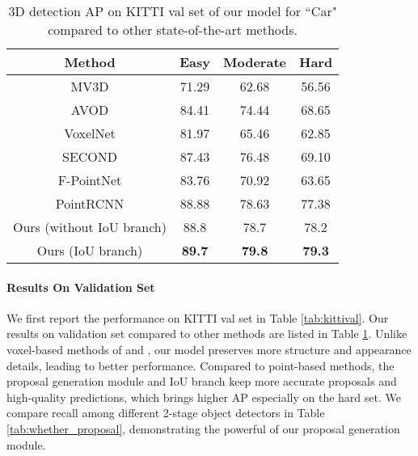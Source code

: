 \documentclass[10pt,twocolumn,letterpaper]{article}
\begin{document}
\begin{table}[t]
   \centering \addtolength{\tabcolsep}{-1pt}
   \footnotesize
   \begin{tabular}{|c|ccc|}
      \hline
      Method & Easy & Moderate & Hard \\
      \hline
      MV3D \cite{MV3D} & 71.29 & 62.68 & 56.56 \\
      AVOD \cite{AVOD} & 84.41 & 74.44 & 68.65 \\
      VoxelNet \cite{VOXELNET} & 81.97 & 65.46 & 62.85 \\ 
      SECOND \cite{yan2018second} & 87.43 & 76.48 & 69.10 \\
      F-PointNet \cite{FPOINTNET} & 83.76 & 70.92 & 63.65 \\
      PointRCNN \cite{shi2018pointrcnn} & 88.88 & 78.63 & 77.38 \\
      \hline
      Ours (without IoU branch) & 88.8 & 78.7 & 78.2 \\
      Ours (IoU branch) & \bf 89.7 & \bf 79.8 & \bf 79.3 \\
      \hline
   \end{tabular}\vspace{0.1cm}
   \caption{3D detection AP on KITTI val set of our model for ``Car" compared to other state-of-the-art methods.}\vspace{-0.05in}
   \label{tab:kittival_compare}
\end{table}



\vspace{-0.1in}
\paragraph{Results On Validation Set}
We first report the performance on KITTI val set in Table \ref{tab:kittival}. Our results on validation set compared to other methods are listed in Table \ref{tab:kittival_compare}. Unlike voxel-based methods of \cite{VOXELNET} and \cite{yan2018second}, our model preserves more structure and appearance details, leading to better performance. Compared to point-based methods, the proposal generation module and IoU branch keep more accurate proposals and high-quality predictions, which brings higher AP especially on the hard set. 
We compare recall among different 2-stage object detectors in Table \ref{tab:whether_proposal}, demonstrating the powerful of our proposal generation module.



\vspace{-0.1in}
\end{document}
